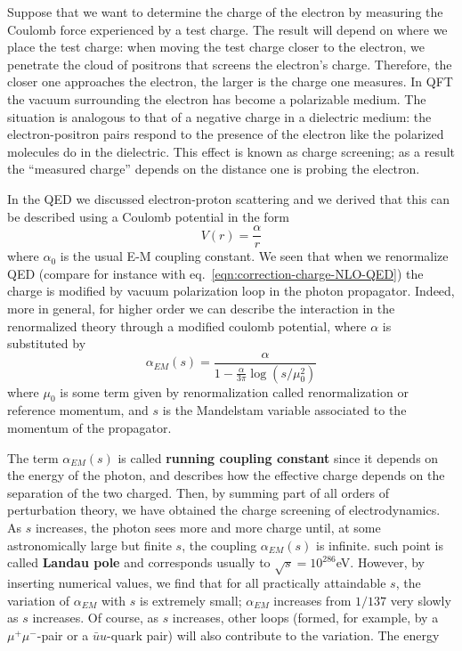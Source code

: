 \documentclass[TheoreticalPhy_ModB.tex]{subfiles}
\begin{document}
Suppose that we want to determine the charge of the electron by measuring the Coulomb force experienced by a test charge. The result will depend on where we place the test charge: when moving the test charge closer to the electron, we penetrate the cloud of positrons that screens the electron's charge. Therefore, the closer one approaches the electron, the larger is the charge one measures. In QFT the vacuum surrounding the electron has become a polarizable medium. The situation is analogous to that of a negative charge in a dielectric medium: the electron-positron pairs respond to the presence of the electron like the polarized molecules do in the dielectric. This effect is known as charge screening; as a result the ``measured charge'' depends on the distance one is probing the electron. 

In the QED we discussed electron-proton scattering and we derived that this can be described using a Coulomb potential in the form
\[V(r)=\frac{\alpha}r\]
where $\alpha_0$ is the usual E-M coupling constant. We seen that when we renormalize QED (compare for instance with eq.~\eqref{eqn:correction-charge-NLO-QED}) the charge is modified by vacuum polarization loop in the photon propagator. Indeed, more in general, for higher order we can describe the interaction in the renormalized theory through a modified coulomb potential, where $\alpha$ is substituted by
\[\alpha_{EM}(s)=\frac{\alpha}{1-\frac{\alpha}{3\pi}\log({s}/{\mu_0^2})}\]
where $\mu_0$ is some term given by renormalization called renormalization or reference momentum, and $s$ is the Mandelstam variable associated to the momentum of the propagator.

The term $\alpha_{EM}(s)$ is called \textbf{running coupling constant} since it depends on the energy of the photon, and describes how the effective charge depends on the separation of the two charged. Then, by summing part of all orders of perturbation theory, we have obtained the charge screening of electrodynamics. As $s$ increases, the photon sees more and more charge until, at some astronomically large but finite $s$, the coupling $\alpha_{EM}(s)$ is infinite. such point is called \textbf{Landau pole} and corresponds usually to $\sqrt s=10^{286}$eV. However, by inserting numerical values, we find that for all practically attaindable $s$, the variation of $\alpha_{EM}$ with $s$ is extremely small; $\alpha_{EM}$ increases from $1/137$ very slowly as $s$ increases. Of course, as $s$ increases, other loops (formed, for example, by a $\mu^+\mu^-$-pair or a $\bar u u$-quark pair) will also contribute to the variation. The energy 
\end{document}

